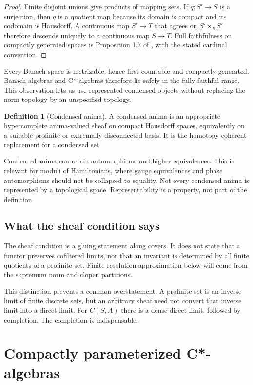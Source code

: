 \documentclass[12pt]{article}
\theoremstyle{definition}
\newtheorem{definition}[theorem]{Definition}
\theoremstyle{remark}
\begin{document}
\begin{proof}
Finite disjoint unions give products of mapping sets.  If $q:S'\to S$ is a
surjection, then $q$ is a quotient map because its domain is compact and its
codomain is Hausdorff.  A continuous map $S'\to T$ that agrees on
$S'\times_S S'$ therefore descends uniquely to a continuous map $S\to T$.
Full faithfulness on compactly generated spaces is Proposition 1.7 of
\cite{ClausenScholze}, with the stated cardinal convention.
\end{proof}

Every Banach space is metrizable, hence first countable and compactly generated.
Banach algebras and C*-algebras therefore lie safely in the fully faithful range.
This observation lets us use represented condensed objects without replacing the
norm topology by an unspecified topology.

\begin{definition}[Condensed anima]
A condensed anima is an appropriate hypercomplete anima-valued sheaf on compact
Hausdorff spaces, equivalently on a suitable profinite or extremally disconnected
basis.  It is the homotopy-coherent replacement for a condensed set.
\end{definition}

Condensed anima can retain automorphisms and higher equivalences.  This is relevant
for moduli of Hamiltonians, where gauge equivalences and phase automorphisms should
not be collapsed to equality.  Not every condensed anima is represented by a
topological space.  Representability is a property, not part of the definition.

\subsection{What the sheaf condition says}

The sheaf condition is a gluing statement along covers.  It does not state that a
functor preserves cofiltered limits, nor that an invariant is determined by all
finite quotients of a profinite set.  Finite-resolution approximation below will
come from the supremum norm and clopen partitions.

This distinction prevents a common overstatement.  A profinite set is an inverse
limit of finite discrete sets, but an arbitrary sheaf need not convert that inverse
limit into a direct limit.  For $C(S,A)$ there is a dense direct limit, followed by
completion.  The completion is indispensable.

\section{Compactly parameterized C*-algebras}
\end{document}
